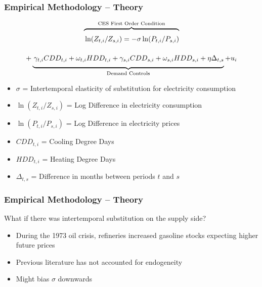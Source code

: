 \documentclass[aspectratio=169]{beamer}
\newcommand{\xoverbrace}[2][\vphantom{\dfrac{A}{A}}]{\overbrace{#1#2}}
\newcommand{\xunderbrace}[2][\vphantom{\dfrac{A}{A}}]{\underbrace{#1#2}}
\begin{document}
\begin{frame}
\frametitle{Empirical Methodology -- Theory}


	
	$$\xoverbrace{\ln (Z_{ t, i} / Z_{ s, i}) = -\sigma \ln (P_{t,i} / P_{s,i})}^{\text{CES First Order Condition}}$$
	\vspace{-1.5em}
	$$+  \xunderbrace{\,\gamma_{t,i}  CDD_{t,i} + \omega_{t,i} HDD_{t,i} + \gamma_{s,i} CDD_{s,i} +  \omega_{s,i} HDD_{s,i}  + \eta \Delta_{t,s}}_{\text{Demand Controls}} + u_i$$
	 
	\begin{itemize}
		\setlength\itemsep{0.25em}
		\item $\sigma$ = Intertemporal elasticity of substitution for electricity consumption
		\item $\ln (Z_{t, i} / Z_{s, i})$ = Log Difference in electricity consumption
		\item $\ln (P_{t,i} / P_{s,i})$ = Log Difference in electricity prices
		\item $CDD_{t,i}$ = Cooling Degree Days
		\item $HDD_{t,i}$ = Heating Degree Days
		\item $\Delta_{t,s}$ = Difference in months between periods $t$ and $s$
	\end{itemize}

\end{frame}


\begin{frame}
\frametitle{Empirical Methodology -- Theory}

\vspace{2em}
\begin{block}{\centering What if there was intertemporal substitution on the supply side?}
	
	\vspace{2em}
	\begin{itemize}
		\item During the 1973 oil crisis,  refineries increased gasoline stocks expecting higher future prices
		\item Previous literature has not accounted for endogeneity
		\item Might bias $\sigma$ downwards
	\end{itemize}
	
\end{block}



\end{frame}
\end{document}
